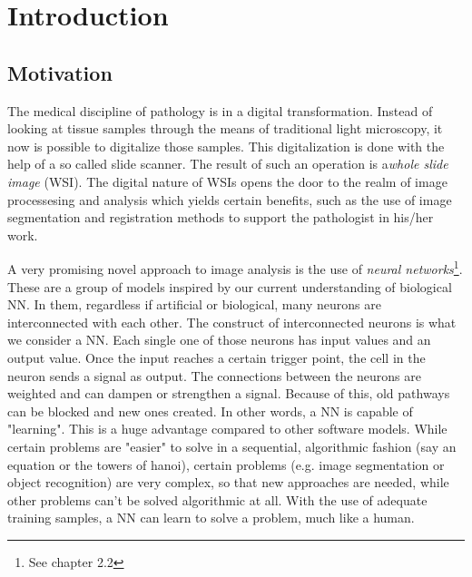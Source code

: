 \chapter{Introduction}

\section{Motivation}
The medical discipline of pathology is in a digital transformation. Instead of looking at tissue samples through the means of traditional light microscopy, it now is possible to digitalize those samples. This digitalization is done with the help of a so called slide scanner. The result of such an operation is a\emph{whole slide image} (WSI)\cite{Cornish13}. The digital nature of WSIs opens the door to the realm of image processesing and analysis which yields certain benefits, such as the use of image segmentation and registration methods to support the pathologist in his/her work.

A very promising novel approach to image analysis is the use of \emph{neural networks}\footnote{See chapter 2.2}. These are a group of models inspired by our current understanding of biological NN. In them, regardless if artificial or biological, many neurons are interconnected with each other. The construct of interconnected neurons is what we consider a NN. Each single one of those neurons has input values and an output value. Once the input reaches a certain trigger point, the cell in the neuron sends a signal as output. The connections between the neurons are weighted and can dampen or strengthen a signal. Because of this, old pathways can be blocked and new ones created. In other words, a NN is capable of "learning"\cite{Kriesel07}. This is a huge advantage compared to other software models. While certain problems are "easier" to solve in a sequential, algorithmic fashion (say an equation or the towers of hanoi), certain problems (e.g. image segmentation or object recognition) are very complex, so that new approaches are needed, while other problems can't be solved algorithmic at all. With the use of adequate training samples, a NN can learn to solve a problem, much like a human.

